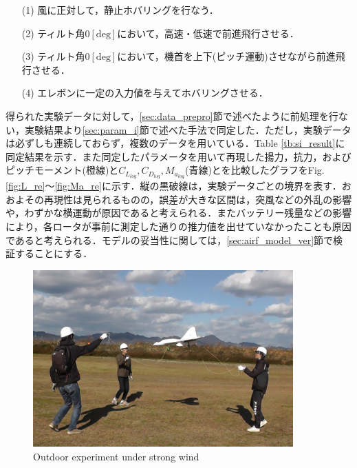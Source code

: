 \begin{itemize}
\item[(1)]風に正対して，静止ホバリングを行なう．
\item[(2)]ティルト角$0\mathrm{[deg]}$において，高速・低速で前進飛行させる．
\item[(3)]ティルト角$0\mathrm{[deg]}$において，機首を上下(ピッチ運動)させながら前進飛行させる．
\item[(4)]エレボンに一定の入力値を与えてホバリングさせる．
\end{itemize}

得られた実験データに対して，\ref{sec:data_prepro}節で述べたように前処理を行ない，実験結果より\ref{sec:param_i}節で述べた手法で同定した．ただし，実験データは必ずしも連続しておらず，複数のデータを用いている．Table \ref{tb:si_result}に同定結果を示す．また同定したパラメータを用いて再現した揚力，抗力，およびピッチモーメント(橙線)と$C_{L_{log}},C_{D_{log}},M_{a_{log}}$(青線)とを比較したグラフをFig. \ref{fig:L_re}〜\ref{fig:Ma_re}に示す．縦の黒破線は，実験データごとの境界を表す．おおよその再現性は見られるものの，誤差が大きな区間は，突風などの外乱の影響や，わずかな横運動が原因であると考えられる．またバッテリー残量などの影響により，各ロータが事前に測定した通りの推力値を出せていなかったことも原因であると考えられる．モデルの妥当性に関しては，\ref{sec:airf_model_ver}節で検証することにする．

\begin{figure}[H]
  \begin{center}
    \includegraphics[clip,width=10cm,bb=0 0 1123 762]{./z_figure_files/chapter4/experiment.jpeg}
    \caption{Outdoor experiment under strong wind}
    \label{fig:flight_ex}
  \end{center}
\end{figure}

